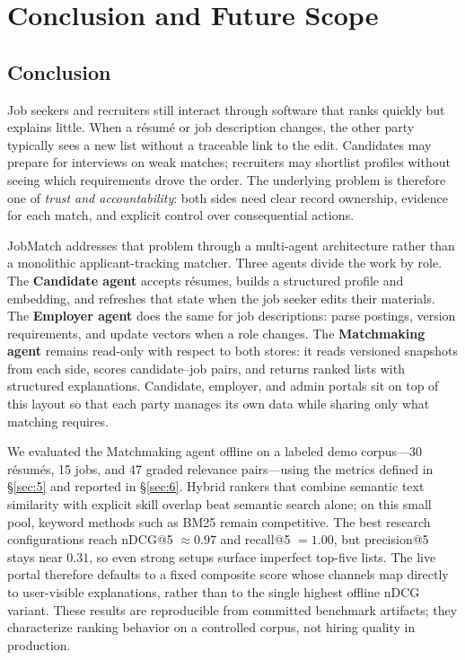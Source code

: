 \section{Conclusion and Future Scope}\label{sec:7}

\subsection{Conclusion}\label{sec:7-conclusion}

Job seekers and recruiters still interact through software that ranks quickly but explains little.
When a résumé or job description changes, the other party typically sees a new list without a traceable link to the edit.
Candidates may prepare for interviews on weak matches; recruiters may shortlist profiles without seeing which requirements drove the order.
The underlying problem is therefore one of \emph{trust and accountability}: both sides need clear record ownership, evidence for each match, and explicit control over consequential actions.

JobMatch addresses that problem through a multi-agent architecture rather than a monolithic applicant-tracking matcher.
Three agents divide the work by role.
The \textbf{Candidate agent} accepts résumes, builds a structured profile and embedding, and refreshes that state when the job seeker edits their materials.
The \textbf{Employer agent} does the same for job descriptions: parse postings, version requirements, and update vectors when a role changes.
The \textbf{Matchmaking agent} remains read-only with respect to both stores: it reads versioned snapshots from each side, scores candidate--job pairs, and returns ranked lists with structured explanations.
Candidate, employer, and admin portals sit on top of this layout so that each party manages its own data while sharing only what matching requires.

We evaluated the Matchmaking agent offline on a labeled demo corpus---30 résumés, 15 jobs, and 47 graded relevance pairs---using the metrics defined in \S\ref{sec:5} and reported in \S\ref{sec:6}.
Hybrid rankers that combine semantic text similarity with explicit skill overlap beat semantic search alone; on this small pool, keyword methods such as BM25 remain competitive.
The best research configurations reach nDCG@5 $\approx 0.97$ and recall@5 $= 1.00$, but precision@5 stays near $0.31$, so even strong setups surface imperfect top-five lists.
The live portal therefore defaults to a fixed composite score whose channels map directly to user-visible explanations, rather than to the single highest offline nDCG variant.
These results are reproducible from committed benchmark artifacts; they characterize ranking behavior on a controlled corpus, not hiring quality in production.

